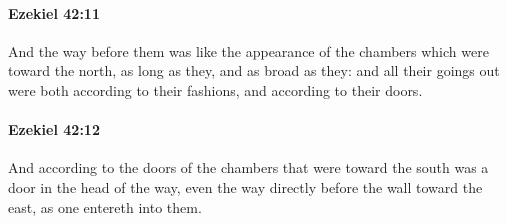 		\paragraph{Ezekiel 42:11} %
			\label{EZEKIEL-42-11}

			And the way before them was like the appearance of the chambers which were toward the north, as long as they, and as broad as they: and all their goings out were both according to their fashions, and according to their doors.


		\paragraph{Ezekiel 42:12} %
			\label{EZEKIEL-42-12}

			And according to the doors of the chambers that were toward the south was a door in the head of the way, even the way directly before the wall toward the east, as one entereth into them.

